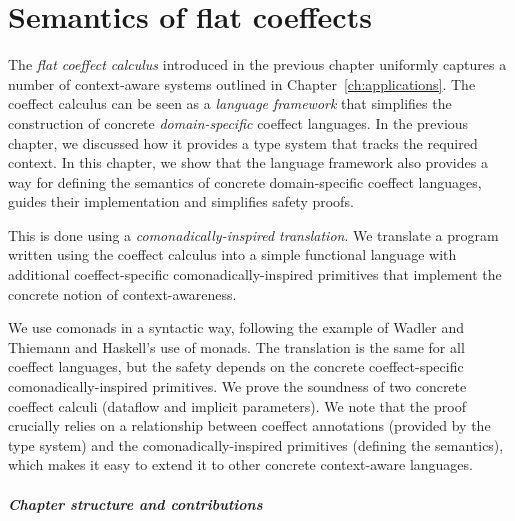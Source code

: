 
\chapter{Semantics of flat coeffects}
\label{ch:semantics}

The \emph{flat coeffect calculus} introduced in the previous chapter uniformly captures a number
of context-aware systems outlined in Chapter~\ref{ch:applications}. The coeffect calculus
can be seen as a \emph{language framework} that simplifies the construction of concrete
\emph{domain-specific} coeffect languages. In the previous chapter, we discussed how it provides a
type system that tracks the required context. In this chapter, we show that the language framework
also provides a way for defining the semantics of concrete domain-specific coeffect languages,
guides their implementation and simplifies safety proofs.

This is done using a \emph{comonadically-inspired translation}. We translate a program written
using the coeffect calculus into a simple functional language with additional coeffect-specific
comonadically-inspired primitives that implement the concrete notion of context-awareness.

We use comonads in a syntactic way, following the example of Wadler and Thiemann \cite{monads-effects-marriage}
and Haskell's use of monads. The translation is the same for all coeffect languages, but the safety
depends on the concrete coeffect-specific comonadically-inspired primitives. We prove the soundness
of two concrete coeffect calculi (dataflow and implicit parameters). We note that the proof
crucially relies on a relationship between coeffect annotations (provided by the type system) and
the comonadically-inspired primitives (defining the semantics), which makes it easy to extend it to
other concrete context-aware languages.

\paragraph{Chapter structure and contributions}

